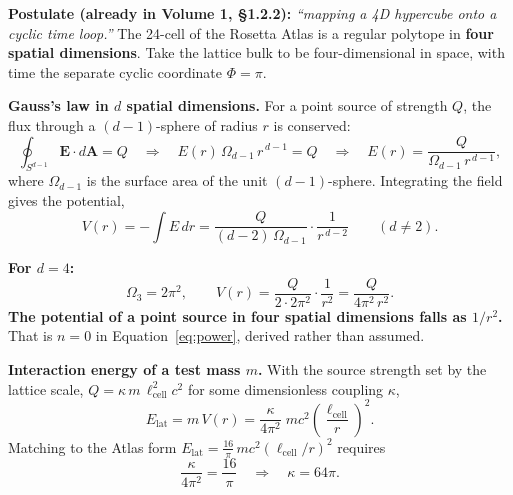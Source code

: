 \documentclass[11pt,letterpaper]{article}
\newcommand{\lcell}{\ell_{\mathrm{cell}}}
\begin{document}
\begin{derivbox}
\textbf{Postulate (already in Volume 1, \S1.2.2):} \emph{``mapping a 4D hypercube onto a
cyclic time loop.''} The 24-cell of the Rosetta Atlas is a regular polytope in \textbf{four
spatial dimensions}. Take the lattice bulk to be four-dimensional in space, with time the
separate cyclic coordinate $\Phi = \pi$.

\medskip
\textbf{Gauss's law in $d$ spatial dimensions.} For a point source of strength $Q$, the flux
through a $(d-1)$-sphere of radius $r$ is conserved:
\[
\oint_{S^{d-1}} \mathbf{E}\cdot d\mathbf{A} = Q
\quad\Longrightarrow\quad
E(r)\,\Omega_{d-1}\,r^{\,d-1} = Q
\quad\Longrightarrow\quad
E(r) = \frac{Q}{\Omega_{d-1}\, r^{\,d-1}},
\]
where $\Omega_{d-1}$ is the surface area of the unit $(d-1)$-sphere. Integrating the field
gives the potential,
\begin{equation}
V(r) = -\!\int E\,dr = \frac{Q}{(d-2)\,\Omega_{d-1}}\cdot\frac{1}{r^{\,d-2}}
\qquad (d \neq 2).
\label{eq:gauss}
\end{equation}

\medskip
\textbf{For $d = 4$:}
\[
\Omega_3 = 2\pi^2, \qquad V(r) = \frac{Q}{2\cdot 2\pi^2}\cdot\frac{1}{r^2}
= \frac{Q}{4\pi^2\, r^2}.
\]
\textbf{The potential of a point source in four spatial dimensions falls as $1/r^2$.} That is
$n = 0$ in Equation~\eqref{eq:power}, derived rather than assumed.

\medskip
\textbf{Interaction energy of a test mass $m$.} With the source strength set by the lattice
scale, $Q = \kappa\, m\, \lcell^2 c^2$ for some dimensionless coupling $\kappa$,
\[
E_{\mathrm{lat}} = m\,V(r) = \frac{\kappa}{4\pi^2}\; m c^2 \left(\frac{\lcell}{r}\right)^2 .
\]
Matching to the Atlas form $E_{\mathrm{lat}} = \tfrac{16}{\pi}\, m c^2 (\lcell/r)^2$ requires
\[
\frac{\kappa}{4\pi^2} = \frac{16}{\pi}
\quad\Longrightarrow\quad
\kappa = 64\pi .
\]
\end{derivbox}
\end{document}
